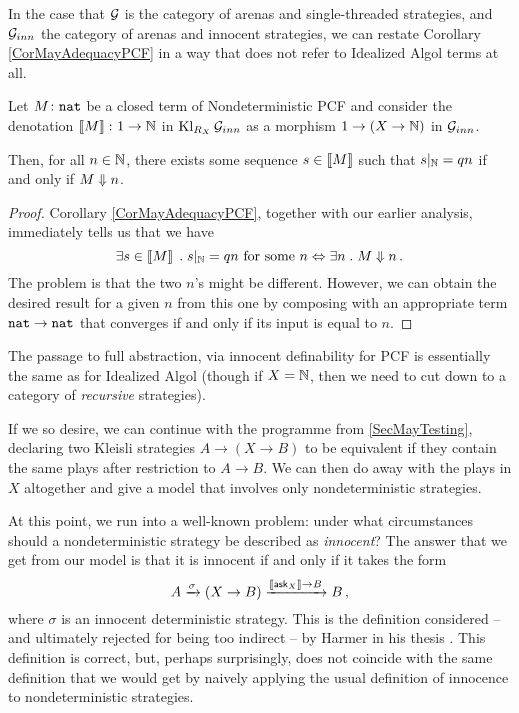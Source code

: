 \documentclass[11pt]{report}
\begin{document}
In the case that $\mathcal G$ is the category of arenas and single-threaded strategies, and $\mathcal G_{inn}$ the category of arenas and innocent strategies, we can restate Corollary \ref{CorMayAdequacyPCF} in a way that does not refer to Idealized Algol terms at all.

\begin{corollary}
  Let $M\colon{\mathtt{nat}}$ be a closed term of Nondeterministic PCF and consider the denotation $\left\llbracket M\right\rrbracket \colon 1 \to \mathbb{N}$ in $\operatorname{Kl}_{R_X}\mathcal G_{inn}$ as a morphism $1 \to (X \to \mathbb{N})$ in $\mathcal G_{inn}$.  

  Then, for all $n\in\mathbb{N}$, there exists some sequence $s\in\left\llbracket M\right\rrbracket$ such that $s\vert_{\mathbb{N}} = qn$ if and only if $M\Downarrow n$.
  \label{CorMayAdequacyPcfComb}
\end{corollary}
\begin{proof}
  Corollary \ref{CorMayAdequacyPCF}, together with our earlier analysis, immediately tells us that we have
  \[
    \exists s\in \left\llbracket M\right\rrbracket \;.\; s\vert_{\mathbb{N}} = qn\text{ for some $n$} \Leftrightarrow \exists n\;.\; M\Downarrow n\,.
    \]
  The problem is that the two $n$'s might be different.  
  However, we can obtain the desired result for a given $n$ from this one by composing with an appropriate term ${\mathtt{nat}} \to {\mathtt{nat}}$ that converges if and only if its input is equal to $n$.
\end{proof}

The passage to full abstraction, via innocent definability for PCF is essentially the same as for Idealized Algol (though if $X=\mathbb{N}$, then we need to cut down to a category of \emph{recursive} strategies).

If we so desire, we can continue with the programme from \sec\ref{SecMayTesting}, declaring two Kleisli strategies $A \to (X \to B)$ to be equivalent if they contain the same plays after restriction to $A \to B$.
We can then do away with the plays in $X$ altogether and give a model that involves only nondeterministic strategies.

At this point, we run into a well-known problem: under what circumstances should a nondeterministic strategy be described as \emph{innocent}? 
The answer that we get from our model is that it is innocent if and only if it takes the form
\[
  A \xrightarrow{\sigma} (X \to B) \xrightarrow{\left\llbracket\operatorname{{\mathsf{ask}}}_X\right\rrbracket \to B} B\,,
  \]
where $\sigma$ is an innocent deterministic strategy.  
This is the definition considered -- and ultimately rejected for being too indirect -- by Harmer in his thesis \cite[]{RusssThesis}.  
This definition is correct, but, perhaps surprisingly, does not coincide with the same definition that we would get by naively applying the usual definition of innocence to nondeterministic strategies.
\end{document}
